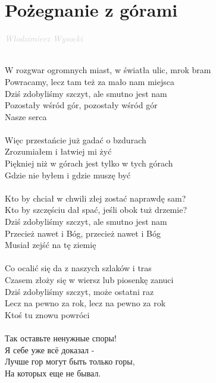 \documentclass[a5paper, 10pt]{book}
\begin{document}
\section{Pożegnanie z górami}\textcolor{lightgray}{\textit{Włodzimierz Wysocki}}\\~\\
\begin{minipage}[t]{0.8\textwidth}
  W rozgwar ogromnych miast, w światła ulic, mrok bram\\
  Powracamy, lecz tam też za mało nam miejsca\\
  Dziś zdobyliśmy szczyt, ale smutno jest nam\\
  Pozostały wśród gór, pozostały wśród gór\\
  Nasze serca\\
  \\
  \hspace*{3mm}Więc przestańcie już gadać o bzdurach\\
  \hspace*{3mm}Zrozumiałem i łatwiej mi żyć\\
  \hspace*{3mm}Piękniej niż w górach jest tylko w tych górach\\
  \hspace*{3mm}Gdzie nie byłem i gdzie muszę być\\
  \\
  Kto by chciał w chwili złej zostać naprawdę sam?\\
  Kto by szczęściu dał spać, jeśli obok tuż drzemie?\\
  Dziś zdobyliśmy szczyt, ale smutno jest nam\\
  Przecież nawet i Bóg, przecież nawet i Bóg\\
  Musiał zejść na tę ziemię\\
  \\
  Co ocalić się da z naszych szlaków i tras\\
  Czasem złoży się w wiersz lub piosenkę zanuci\\
  Dziś zdobyliśmy szczyt, może ostatni raz\\
  Lecz na pewno za rok, lecz na pewno za rok\\
  Ktoś tu znowu powróci\\
  \\
  \foreignlanguage{russian}{
    \hspace*{5mm} Так оставьте ненужные споры!\\
    \hspace*{5mm} Я себе уже всё доказал -\\
    \hspace*{5mm} Лучше гор могут быть только горы,\\
    \hspace*{5mm} На которых еще не бывал.\\
  }
\end{minipage}
\end{document}
